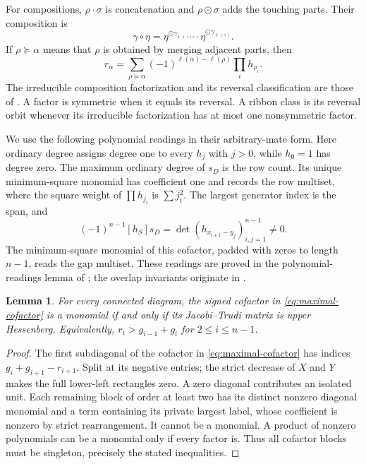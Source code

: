 \documentclass[11pt,a4paper]{amsart}
\numberwithin{equation}{section}
\theoremstyle{plain}
\newtheorem{lemma}[theorem]{Lemma}
\theoremstyle{definition}
\begin{document}
For compositions, \(\rho\cdot\sigma\) is concatenation and \(\rho\odot\sigma\) adds the touching parts.  Their composition is
\[
 \gamma\circ\eta=
 \eta^{\odot\gamma_1}\cdot\cdots\cdot\eta^{\odot\gamma_{\ell(\gamma)}}.
\]
If \(\rho\succeq\alpha\) means that \(\rho\) is obtained by merging adjacent parts, then
\begin{equation}\label{eq:ribbon}
 r_\alpha=\sum_{\rho\succeq\alpha}
 (-1)^{\ell(\alpha)-\ell(\rho)}\prod_i h_{\rho_i}.
\end{equation}
The irreducible composition factorization and its reversal classification are those of \cite{Billera2006DecomposableCompositions}.  A factor is symmetric when it equals its reversal.  A ribbon class is its reversal orbit whenever its irreducible factorization has at most one nonsymmetric factor.

We use the following polynomial readings in their arbitrary-mate form.  Here ordinary degree assigns degree one to every \(h_j\) with \(j>0\), while \(h_0=1\) has degree zero.  The maximum ordinary degree of \(s_D\) is the row count.  Its unique minimum-square monomial has coefficient one and records the row multiset, where the square weight of \(\prod h_{j_i}\) is \(\sum j_i^2\).  The largest generator index is the span, and
\begin{equation}\label{eq:maximal-cofactor}
 (-1)^{n-1}[h_S]s_D
 =\det(h_{x_{i+1}-y_j})_{i,j=1}^{n-1}\ne0.
\end{equation}
The minimum-square monomial of this cofactor, padded with zeros to length \(n-1\), reads the gap multiset.  These readings are proved in the polynomial-readings lemma of \cite{Shields2026Cofactor}; the overlap invariants originate in \cite{Reiner2007Coincidences}.

\begin{lemma}\label{lem:hessenberg-membership}
For every connected diagram, the signed cofactor in \eqref{eq:maximal-cofactor} is a monomial if and only if its Jacobi--Trudi matrix is upper Hessenberg.  Equivalently, \(r_i>g_{i-1}+g_i\) for \(2\le i\le n-1\).
\end{lemma}
\begin{proof}
The first subdiagonal of the cofactor in \eqref{eq:maximal-cofactor} has indices \(g_i+g_{i+1}-r_{i+1}\).  Split at its negative entries; the strict decrease of \(X\) and \(Y\) makes the full lower-left rectangles zero.  A zero diagonal contributes an isolated unit.  Each remaining block of order at least two has its distinct nonzero diagonal monomial and a term containing its private largest label, whose coefficient is nonzero by strict rearrangement.  It cannot be a monomial.  A product of nonzero polynomials can be a monomial only if every factor is.  Thus all cofactor blocks must be singleton, precisely the stated inequalities.
\end{proof}
\end{document}
